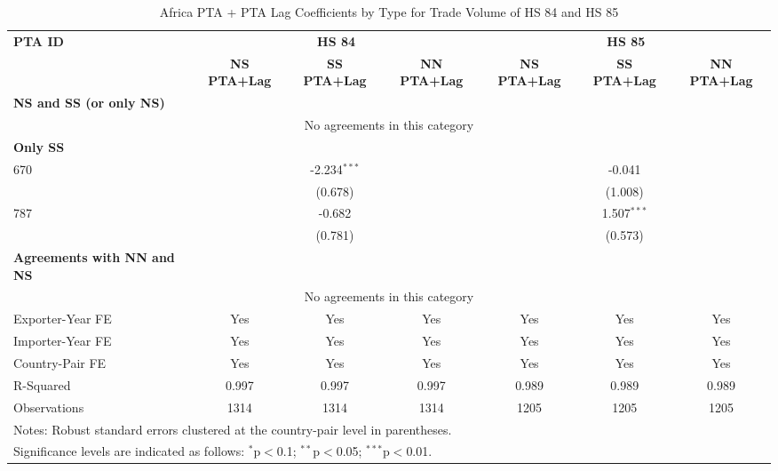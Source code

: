 \begin{table}[htbp]
    \centering
    \caption{Africa PTA + PTA Lag Coefficients by Type for Trade Volume of HS 84 and HS 85}
    \label{tab:HS_trade_africa_pta}
    \begin{adjustbox}{max width=\textwidth}
    \begin{tabular}{lcccccc}
    \hline
    \textbf{PTA ID} & \multicolumn{3}{c}{\textbf{HS 84}} & \multicolumn{3}{c}{\textbf{HS 85}} \\
    & \textbf{NS PTA+Lag} & \textbf{SS PTA+Lag} & \textbf{NN PTA+Lag} & \textbf{NS PTA+Lag} & \textbf{SS PTA+Lag} & \textbf{NN PTA+Lag} \\
    \hline
    \textbf{NS and SS (or only NS)} &  &  &  &  &  &  \\
    \hline
    \multicolumn{7}{c}{No agreements in this category} \\
    \hline
    \textbf{Only SS} &  &  &  &  &  &  \\
    \hline
    670 &  & -2.234$^{\ast\ast\ast}$ &  &  & -0.041 &  \\
    &  & (0.678) &  &  & (1.008) &  \\
    787 &  & -0.682 &  &  & 1.507$^{\ast\ast\ast}$ &  \\
    &  & (0.781) &  &  & (0.573) &  \\
    \hline
    \textbf{Agreements with NN and NS} &  &  &  &  &  &  \\
    \hline
    \multicolumn{7}{c}{No agreements in this category} \\
    \hline
    Exporter-Year FE & Yes & Yes & Yes & Yes & Yes & Yes \\
    Importer-Year FE & Yes & Yes & Yes & Yes & Yes & Yes \\
    Country-Pair FE & Yes & Yes & Yes & Yes & Yes & Yes \\
    R-Squared & 0.997 & 0.997 & 0.997 & 0.989 & 0.989 & 0.989 \\
    Observations & 1314 & 1314 & 1314 & 1205 & 1205 & 1205 \\
    \hline
    \multicolumn{7}{l}{\footnotesize{Notes: Robust standard errors clustered at the country-pair level in parentheses.}} \\
    \multicolumn{7}{l}{\footnotesize{Significance levels are indicated as follows: $^{\ast}$p$<$0.1; $^{\ast\ast}$p$<$0.05; $^{\ast\ast\ast}$p$<$0.01.}} \\
    \end{tabular}
    \end{adjustbox}
\end{table}
